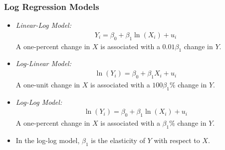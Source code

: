 \begin{frame}
\frametitle{Log Regression Models}
\begin{itemize}
\item \emph{Linear-Log Model:} 
\begin{align*}
Y_{i} = \beta_{0} + \beta_{1} \ln(X_{i}) + u_{i}
\end{align*}
A one-percent change in $X$ is associated with a $0.01\beta_{1}$ change in $Y$. 
\item \emph{Log-Linear Model:} 
\begin{align*}
\ln(Y_{i}) = \beta_{0} + \beta_{1} X_{i} + u_{i}
\end{align*}
A one-unit change in $X$ is associated with a $100\beta_{1}\%$ change in $Y$. 
\item \emph{Log-Log Model:} 
\begin{align*}
\ln(Y_{i}) = \beta_{0} + \beta_{1} \ln(X_{i}) + u_{i}
\end{align*}
A one-percent change in $X$ is associated with a $\beta_{1}\%$ change in $Y$.
\item In the log-log model, $\beta_{1}$ is the elasticity of $Y$ with respect to $X$. 
\end{itemize}
\end{frame}

